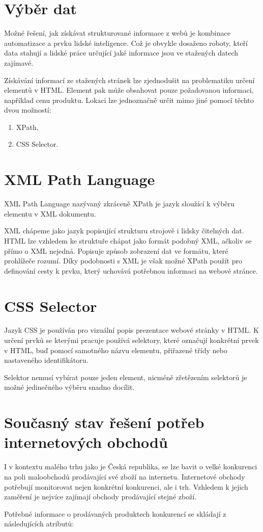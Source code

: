 \documentclass[thesis=B,czech]{FITthesis}[2012/06/26]
\begin{document}
\section{Výběr dat}
Možné řešení, jak získávat strukturované informace z webů je kombinace automatizace a prvku lidské inteligence.
Což je obvykle dosaženo roboty, kteří data stahují a lidské práce určující jaké informace jsou ve stažených datech zajímavé.
\par
Získávání informací ze stažených stránek lze zjednodušit na problematiku určení elementů v HTML.
Element pak může obsahovat pouze požadovanou informaci, například cenu produktu.
Lokaci lze jednoznačně určit mimo jiné pomocí těchto dvou možností:
\begin{enumerate}
\item XPath,
\item CSS Selector.
\end{enumerate}


\section{XML Path Language}
XML Path Language\cite{XPath} nazývaný zkráceně XPath je jazyk sloužící k výběru elementu v  XML\cite{XML} dokumentu.
\par
XML chápeme jako jazyk popisující strukturu strojově i lidsky čitelných dat.
HTML lze vzhledem ke struktuře chápat jako formát podobný XML, ačkoliv se přímo o XML nejedná\cite{HTML}. 
Popisuje způsob zobrazení dat ve formátu, které prohlížeče rozumí.
Díky podobnosti s XML je však možné XPath použít pro definování cesty k prvku, který uchovává potřebnou informaci na webové stránce.
\par
\section{CSS Selector}
Jazyk CSS je používán pro vizuální popis prezentace webové stránky v HTML. K určení prvků se kterými
pracuje používá selektory, které označují konkrétní prvek v HTML, buď pomocí samotného názvu elementu, přiřazené třídy nebo nastaveného
identifikátoru.\cite{CSS}
\par
Selektor nemusí vybírat pouze jeden element, nicméně zřetězením selektorů je možné jedinečného výběru snadno docílit.

\newpage

\section{Současný stav řešení potřeb internetových obchodů}
I v kontextu malého trhu jako je Česká republika, se lze bavit o velké konkurenci na poli 
maloobchodů prodávající své zboží na internetu.
Internetové obchody potřebují monitorovat nejen konkrétní konkurenci, ale i trh. Vzhledem k jejich zaměření je nejvíce zajímají 
obchody prodávající stejné zboží. 
\par
Potřebné informace o prodávaných produktech konkurencí se skládají z následujících atributů:
\end{document}
